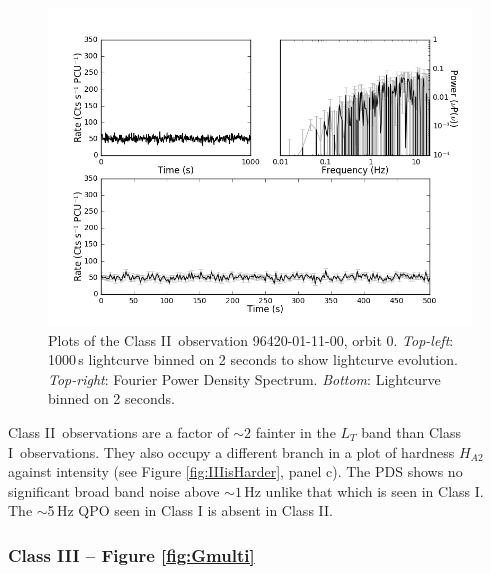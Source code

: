 \begin{figure}
    \includegraphics[width=0.8\columnwidth, trim = 0.6cm 0 3.9cm 0]{images/Emulti.png}
    \captionsetup{singlelinecheck=off}
    \caption[Characteristic lightcurves and a power spectrum of Type II variability.]{Plots of the Class II\indexii\ observation 96420-01-11-00, orbit 0.  \textit{Top-left}:  1000\,s lightcurve binned on 2 seconds to show lightcurve evolution.  \textit{Top-right}: Fourier Power Density Spectrum.  \textit{Bottom}: Lightcurve binned on 2 seconds.}
   \label{fig:Emulti}
\end{figure}

\par Class II\indexii\ observations are a factor of $\sim2$ fainter in the $L_T$ band than Class I\indexi\ observations.  They also occupy a different branch in a plot of hardness $H_{A2}$ against intensity (see Figure \ref{fig:IIIisHarder}, panel c).  The PDS shows no significant broad band noise above $\sim1$\,Hz unlike that which is seen in Class I.  The $\sim$5\,Hz QPO seen in Class I is absent in Class II.

\subsubsection{Class III -- Figure \ref{fig:Gmulti}}
\label{sec:classIII}

